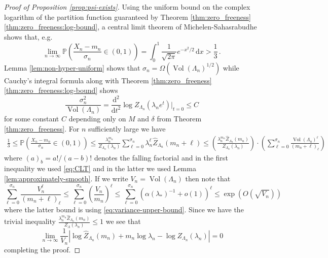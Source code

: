 \documentclass[10pt]{amsart}
\theoremstyle{definition}
\theoremstyle{remark}
\newcommand{\Vol}{\operatorname{Vol}}
\renewcommand{\P}{\mathbb{P}}
\newcommand{\diff}{\mathrm{d}}
\begin{document}
\begin{proof}[Proof of Proposition \ref{prop:psi-exists}]
		Using the uniform bound on the complex logarithm of the partition function guaranteed by Theorem \ref{thm:zero_freeness}\ref{thm:zero_freeness:log-bound}, a central limit theorem of Michelen-Sahasrabudhe \cite[Theorem 1.8]{michelen2025central} shows that, e.g.\, \begin{equation} \label{eq:CLT}
			\lim_{n \to \infty} \P\left( \frac{X_n - m_n}{\sigma_n} \in (0,1) \right) = \int_0^1 \frac{1}{\sqrt{2\pi}} e^{-x^2 / 2}\,\diff x > \frac{1}{3}\,.
		\end{equation}
		Lemma \ref{lem:non-hyper-uniform} shows that $\sigma_n = \Omega(\Vol(\Lambda_n)^{1/2})$ while Cauchy's integral formula along with Theorem \ref{thm:zero_freeness}\ref{thm:zero_freeness:log-bound} shows \begin{equation}\label{eq:variance-upper-bound}
			\frac{\sigma_n^2}{\Vol(\Lambda_n)} = \frac{\diff^2}{\diff t^2} \log Z_{\Lambda_n} (\lambda_n e^{t}) \bigg|_{t = 0} \leq C
		\end{equation}
		for some constant $C$ depending only on $M$ and $\delta$ from Theorem \ref{thm:zero_freeness}.  For $n$ sufficiently large we have \begin{align*}
			\frac{1}{3} \leq \P\left(\frac{X_n - m_n}{\sigma_n} \in (0,1) \right) \leq \frac{\lambda_n^{m_n}}{Z_{\Lambda_n}(\lambda_n)} \sum_{\ell = 0}^{\sigma_n} \lambda_n^\ell \widehat{Z}_{\Lambda_n}(m_n + \ell) \leq \left( \frac{\lambda_n^{m_n} \widehat{Z}_{\Lambda_n}(m_n)}{Z_{\Lambda_n} (\lambda_n)} \right) \cdot \left( \sum_{\ell = 0}^{\sigma_n} \frac{\Vol(\Lambda_n)^{\ell}}{(m_n + \ell)_\ell} \right)
		\end{align*}
		where $(a)_b=a!/(a-b)!$ denotes the falling factorial and
		in the first inequality we used \eqref{eq:CLT} and in the latter we used Lemma \ref{lem:approximately-smooth}.  If we write $V_n = \Vol(\Lambda_n)$ then note that \begin{equation*}
			\sum_{\ell = 0}^{\sigma_n} \frac{V_n^\ell}{(m_n + \ell)_\ell} \leq \sum_{\ell = 0}^{\sigma_n} \left(\frac{V_n}{m_n} \right)^{\ell}  \leq \sum_{\ell = 0}^{\sigma_n} \left(\alpha(\lambda_\ast)^{-1} + o(1) \right)^{\ell} \leq \exp(O(\sqrt{V_n}))
		\end{equation*}
		where the latter bound is using \eqref{eq:variance-upper-bound}.  Since we have the trivial inequality $\frac{\lambda_n^{m_n} \widehat{Z}_{\Lambda_n}(m_n)}{Z_{\Lambda} (\lambda_n)} \leq 1$ we see that \begin{equation*}
			\lim_{n \to \infty} \frac{1}{V_n}\left| \log \widehat{Z}_{\Lambda_n}(m_n) + m_n \log \lambda_n - \log Z_{\Lambda_n}(\lambda_n) \right| = 0
		\end{equation*}    
		completing the proof.
	\end{proof}
	
\end{document}
